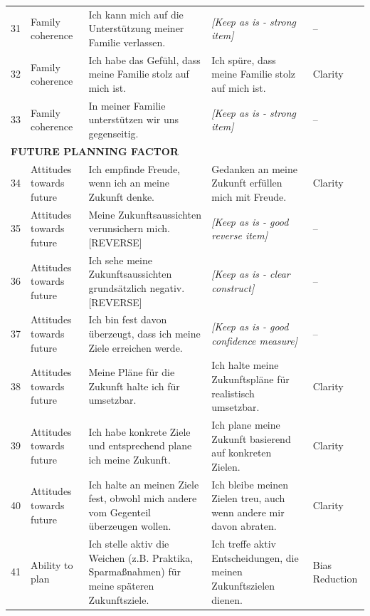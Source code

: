 \documentclass[12pt,a4paper]{article}
\begin{document}
\begin{longtable}{p{}p{}p{}p{}p{}}
31 & Family coherence & Ich kann mich auf die Unterstützung meiner Familie verlassen. & \textit{[Keep as is - strong item]} & -- \\

32 & Family coherence & Ich habe das Gefühl, dass meine Familie stolz auf mich ist. & Ich spüre, dass meine Familie stolz auf mich ist. & Clarity \\

33 & Family coherence & In meiner Familie unterstützen wir uns gegenseitig. & \textit{[Keep as is - strong item]} & -- \\

\midrule
\multicolumn{5}{l}{\textbf{FUTURE PLANNING FACTOR}} \\
\midrule

34 & Attitudes towards future & Ich empfinde Freude, wenn ich an meine Zukunft denke. & Gedanken an meine Zukunft erfüllen mich mit Freude. & Clarity \\

35 & Attitudes towards future & Meine Zukunftsaussichten verunsichern mich. [REVERSE] & \textit{[Keep as is - good reverse item]} & -- \\

36 & Attitudes towards future & Ich sehe meine Zukunftsaussichten grundsätzlich negativ. [REVERSE] & \textit{[Keep as is - clear construct]} & -- \\

37 & Attitudes towards future & Ich bin fest davon überzeugt, dass ich meine Ziele erreichen werde. & \textit{[Keep as is - good confidence measure]} & -- \\

38 & Attitudes towards future & Meine Pläne für die Zukunft halte ich für umsetzbar. & Ich halte meine Zukunftspläne für realistisch umsetzbar. & Clarity \\

39 & Attitudes towards future & Ich habe konkrete Ziele und entsprechend plane ich meine Zukunft. & Ich plane meine Zukunft basierend auf konkreten Zielen. & Clarity \\

40 & Attitudes towards future & Ich halte an meinen Ziele fest, obwohl mich andere vom Gegenteil überzeugen wollen. & Ich bleibe meinen Zielen treu, auch wenn andere mir davon abraten. & Clarity \\

41 & Ability to plan & Ich stelle aktiv die Weichen (z.B. Praktika, Sparmaßnahmen) für meine späteren Zukunftsziele. & Ich treffe aktiv Entscheidungen, die meinen Zukunftszielen dienen. & Bias Reduction \\


\end{longtable}
\end{document}
